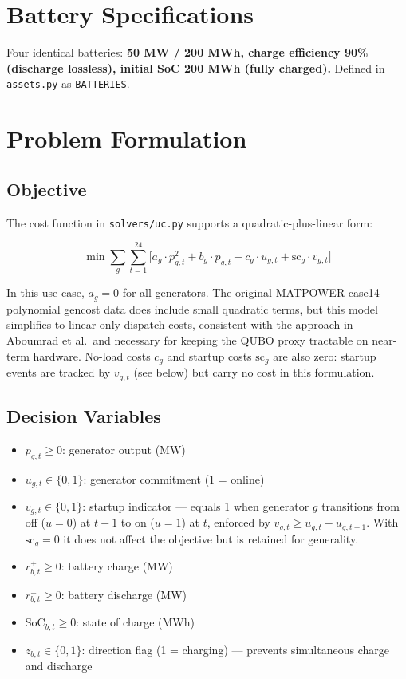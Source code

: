 \documentclass[11pt]{article}
\begin{document}
\section{Battery Specifications}

Four identical batteries: \textbf{50 MW / 200 MWh, charge efficiency 90\% (discharge lossless), initial SoC 200 MWh (fully charged).} Defined in \texttt{assets.py} as \texttt{BATTERIES}.

\section{Problem Formulation}
\label{sec:formulation}

\subsection{Objective}

The cost function in \texttt{solvers/uc.py} supports a quadratic-plus-linear form:

\[
\min \sum_{g} \sum_{t=1}^{24} \bigl[ a_g \cdot p_{g,t}^2 + b_g \cdot p_{g,t} + c_g \cdot u_{g,t} + \text{sc}_g \cdot v_{g,t} \bigr]
\]

In this use case, $a_g = 0$ for all generators. The original MATPOWER case14 polynomial gencost data does include small quadratic terms, but this model simplifies to linear-only dispatch costs, consistent with the approach in Aboumrad et al.\ and necessary for keeping the QUBO proxy tractable on near-term hardware. No-load costs $c_g$ and startup costs $\text{sc}_g$ are also zero: startup events are tracked by $v_{g,t}$ (see below) but carry no cost in this formulation.

\subsection{Decision Variables}

\begin{itemize}[noitemsep]
  \item $p_{g,t} \geq 0$: generator output (MW)
  \item $u_{g,t} \in \{0,1\}$: generator commitment (1 = online)
  \item $v_{g,t} \in \{0,1\}$: startup indicator --- equals 1 when generator $g$ transitions from off ($u=0$) at $t-1$ to on ($u=1$) at $t$, enforced by $v_{g,t} \geq u_{g,t} - u_{g,t-1}$. With $\text{sc}_g = 0$ it does not affect the objective but is retained for generality.
  \item $r^+_{b,t} \geq 0$: battery charge (MW)
  \item $r^-_{b,t} \geq 0$: battery discharge (MW)
  \item $\text{SoC}_{b,t} \geq 0$: state of charge (MWh)
  \item $z_{b,t} \in \{0,1\}$: direction flag (1 = charging) --- prevents simultaneous charge and discharge
\end{itemize}
\end{document}
